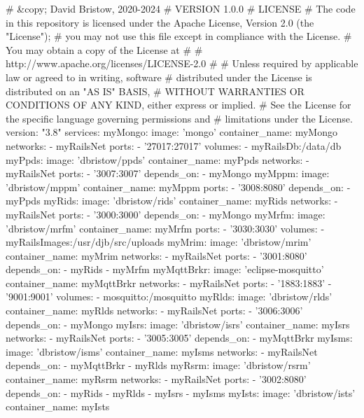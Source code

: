 \begin{fslisting}
# &copy; David Bristow, 2020-2024
# VERSION 1.0.0 
# LICENSE
# The code in this repository is licensed under the Apache License, Version 2.0 (the "License");
# you may not use this file except in compliance with the License.
# You may obtain a copy of the License at
# 
#    http://www.apache.org/licenses/LICENSE-2.0
# 
# Unless required by applicable law or agreed to in writing, software
# distributed under the License is distributed on an "AS IS" BASIS,
# WITHOUT WARRANTIES OR CONDITIONS OF ANY KIND, either express or implied.
# See the License for the specific language governing permissions and
# limitations under the License.
version: "3.8"
services:
  myMongo:
    image: 'mongo'
    container_name: myMongo
    networks:
      - myRailsNet
    ports:
      - '27017:27017'
    volumes: 
      - myRailsDb:/data/db
  myPpds:
     image: 'dbristow/ppds'
     container_name: myPpds
     networks:
      - myRailsNet
     ports: 
      - '3007:3007'
     depends_on:
      - myMongo
  myMppm:
    image: 'dbristow/mppm'
    container_name: myMppm
    ports:
       - '3008:8080'
    depends_on:
       - myPpds
  myRids:
    image: 'dbristow/rids'
    container_name: myRids
    networks:
      - myRailsNet
    ports:
      - '3000:3000'
    depends_on:
      - myMongo
  myMrfm:
    image: 'dbristow/mrfm'
    container_name: myMrfm
    ports: 
      - '3030:3030'
    volumes:
      - myRailsImages:/usr/djb/src/uploads
  myMrim:
   image: 'dbristow/mrim'
   container_name: myMrim
   networks:
      - myRailsNet
   ports:
      - '3001:8080'
   depends_on:
      - myRids
      - myMrfm
  myMqttBrkr:
    image: 'eclipse-mosquitto'
    container_name: myMqttBrkr
    networks:
      - myRailsNet
    ports:
      - '1883:1883'
      - '9001:9001'
    volumes:
      - mosquitto:/mosquitto
  myRlds:
    image: 'dbristow/rlds'
    container_name: myRlds
    networks:
      - myRailsNet
    ports:
      - '3006:3006'
    depends_on:
      - myMongo
  myIsrs:
    image: 'dbristow/isrs'
    container_name: myIsrs
    networks:
      - myRailsNet
    ports:
      - '3005:3005'
    depends_on:
      - myMqttBrkr
  myIsms:
    image: 'dbristow/isms'
    container_name: myIsms
    networks:
      - myRailsNet
    depends_on:
      - myMqttBrkr
      - myRlds
  myRsrm:
    image: 'dbristow/rsrm'
    container_name: myRsrm
    networks:
      - myRailsNet
    ports:
      - '3002:8080'
    depends_on:
      - myRids
      - myRlds
      - myIsrs
      - myIsms
  myIsts:
    image: 'dbristow/ists'
    container_name: myIsts

\end{fslisting}
